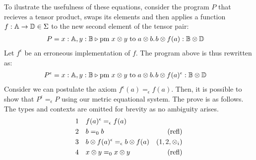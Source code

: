 \begin{example} \label{ex:metric_eqs}
  To ilustrate the usefulness of these equations, consider the program $P$ that recieves a tensor product, swaps its elements and then applies a function $f: \mathbb{A} \to \mathbb{D} \in \Sigma $ to the new second element of the tensor  pair:
\begin{equation*}
\begin{split}
& P = x : \mathbb{A},  y : \mathbb{B} \triangleright \text{pm} \hspace{3 pt} x \otimes y\hspace{3 pt} \text{to} \hspace{3 pt} a \otimes b. \hspace{1pt} b \otimes f(a) : \mathbb{B} \otimes \mathbb{D} &
\end{split}
\end{equation*}
Let $ f^{\epsilon} $ be an erroneous implementation of $ f $. The program above is thus rewritten as:
\begin{equation*}
  \begin{split}
  & P^{\epsilon} = x : \mathbb{A},  y : \mathbb{B} \triangleright \text{pm} \hspace{3 pt} x \otimes y\hspace{3 pt} \text{to} \hspace{3 pt} a \otimes b. \hspace{1pt} b \otimes f(a)^{\epsilon}  : \mathbb{B} \otimes \mathbb{D} &
  \end{split}
  \end{equation*}
Consider we can postulate the axiom $f^{\epsilon}(a) =_{\epsilon} f(a)$. Then, it is possible to show that $P^{\epsilon} =_{\epsilon} P $ using our metric equational system. The prove is as follows. The types and contexts are omitted for brevity as no ambiguity arises.
\begin{equation*}
  \begin{split}
  1 \hspace{10 pt} & f(a)^{\epsilon} =_{\epsilon} f(a) \\
  2 \hspace{10 pt} &  b =_{0} b & {(\text{refl})} \\
  3 \hspace{10 pt} & b \otimes f(a)^{\epsilon}  =_{\epsilon} b \otimes f(a)  & \text{($1,2,\otimes_i$)} \\
  4 \hspace{10 pt} &   x \otimes y =_{0}  x \otimes y  &{(\text{refl})}  \\

\end{split}
\end{equation*}
\end{example}
